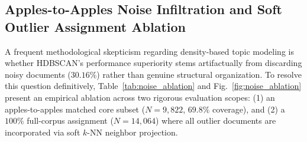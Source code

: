 \documentclass[a4paper,10pt,conference]{IEEEtran}
\begin{document}
\subsection{Apples-to-Apples Noise Infiltration and Soft Outlier Assignment Ablation}

A frequent methodological skepticism regarding density-based topic modeling is whether HDBSCAN's performance superiority stems artifactually from discarding noisy documents ($30.16\%$) rather than genuine structural organization. To resolve this question definitively, Table~\ref{tab:noise_ablation} and Fig.~\ref{fig:noise_ablation} present an empirical ablation across two rigorous evaluation scopes: (1) an apples-to-apples matched core subset ($N=9{,}822$, $69.8\%$ coverage), and (2) a $100\%$ full-corpus assignment ($N=14{,}064$) where all outlier documents are incorporated via soft $k$-NN neighbor projection.

\begin{table}[t]
\centering
\caption{Apples-to-apples noise ablation: evaluating HDBSCAN versus parametric baselines across matched core subset ($69.8\%$ coverage) and full corpus with soft outlier assignment ($100\%$ coverage).}
\label{tab:noise_ablation}
\end{table}
\end{document}
